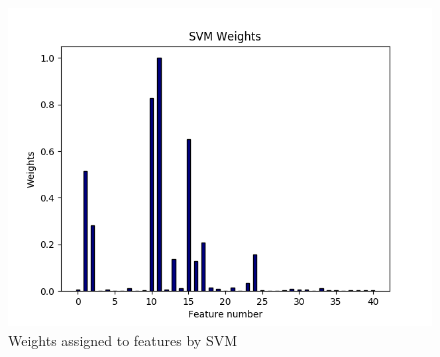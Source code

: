  \begin{figure}[htb]
 	\centering
 	\includegraphics[width=1\textwidth]{images/svm_weights.png}
 	\caption{Weights assigned to features by SVM} 
 	\label{fig:result_svm_weights}
 \end{figure}

